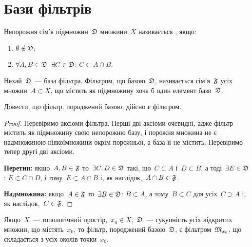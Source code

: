 \section{Бази фільтрів}

\begin{definition}
    Непорожня сім'я підмножин~$\frak D$ множини~$X$ називається , якщо:
    \begin{enumerate}
        \item $\emptyset \notin \frak D$;
        \item $\forall A, B \in \frak D$~$\exists C \in \frak D$: $C \subset A \cap B$.
    \end{enumerate}
\end{definition}

\begin{definition}
    Нехай~$\frak D$~--- база фільтра. Фільтром, що  базою~$\frak D$, називається сім'я~$\frak F$ усіх множин~$A \subset X$, що містять як підмножину хоча б один елемент бази~$\frak D$.
\end{definition}

\begin{exercise}
    Довести, що фільтр, породжений базою, дійсно є фільтром.
\end{exercise}
\begin{proof}
    Перевіримо аксіоми фільтра. Перші дві аксіоми очевидні, адже фільтр містить як підмножину свою непорожню базу, і порожня множина не є надмножиною ніякоїмножини окрім порожньої, а база її не містить. Перевіримо тепер другі дві аксіоми. 
    
    \textbf{Перетин:} якщо~$A, B \in \frak F$ то~$\exists C, D \in \frak D$ такі, що~$C \subset A$ і~$D \subset B$, а тоді~$\exists E \in \frak D$: $E \subset C \cap D$, і тому~$E \subset A \cap B$ і, як наслідок,~$A \cap B \in \frak F$. 
    
    \textbf{Надмножина:} якщо~$A \in \frak F$ то~$\exists B \in \frak D$: $B \subset A$, а тому~$B 
    \subset C$ для усіх~$C \supset A$ і, як наслідок,~$C \in \frak F$.
\end{proof}

\begin{example}
    Якщо~$X$~--- топологічний простір,~$x_0 \in X$,~$\frak D$~--- сукупність усіх відкритих множин, що містять~$x_0$, то фільтр, породжений базою~$\frak D$, є фільтром~$\frak M_{x_0}$, що складається з усіх околів точки~$x_0$.
\end{example}

